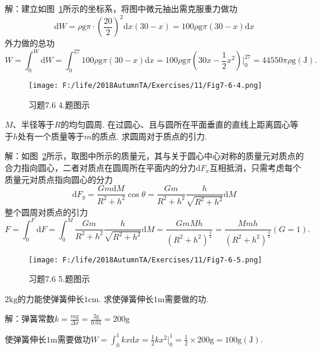 \documentclass[12pt,UTF8]{ctexart}
\begin{document}
\begin{enumerate}
解：建立如图~\ref{7-6-4}所示的坐标系，将图中微元抽出需克服重力做功
\[\mathrm dW=\rho\mathrm g\pi\cdot(\frac{20}2)^2\mathrm dx(30-x)=100\rho\mathrm g\pi(30-x)\mathrm dx\]
外力做的总功
\[W=\int_0^W\mathrm dW=\int_0^{27}100\rho\mathrm g\pi(30-x)\mathrm dx=100\rho\mathrm g\pi(30x-\frac12x^2)\Big|_0^{27}=44550\pi\rho\mathrm g(\mathrm J).\]
\begin{figure}[H]
\begin{center}
\texttt{[image: F:/life/2018AutumnTA/Exercises/11/Fig7-6-4.png]}
\end{center}
\caption{习题7.6 4.题图示}
\label{7-6-4}
\end{figure}
$M$、半径等于$R$的均匀圆周. 在过圆心、且与圆所在平面垂直的直线上距离圆心等于$h$处有一个质量等于$m$的质点. 求圆周对于质点的引力.

解：如图~\ref{7-6-5}所示，取图中所示的质量元，其与关于圆心中心对称的质量元对质点的合力指向圆心，二者对质点在圆周所在平面内的分力$\mathrm dF_x$互相抵消，只需考虑每个质量元对质点指向圆心的分力
\[\mathrm dF_y=\frac{Gm\mathrm dM}{R^2+h^2}\cos\theta=\frac{Gm}{R^2+h^2}\frac h{\sqrt{R^2+h^2}}\mathrm dM\]
整个圆周对质点的引力
\[F=\int_0^F\mathrm dF=\int_0^M\frac{Gm}{R^2+h^2}\frac h{\sqrt{R^2+h^2}}\mathrm dM=\frac{GmMh}{(R^2+h^2)^{\frac32}}=\frac{Mmh}{(R^2+h^2)^{\frac32}}(G=1).\]
\begin{figure}[H]
\begin{center}
\texttt{[image: F:/life/2018AutumnTA/Exercises/11/Fig7-6-5.png]}
\end{center}
\caption{习题7.6 5.题图示}
\label{7-6-5}
\end{figure}
$2\mathrm{kg}$的力能使弹簧伸长$1\mathrm{cm}$. 求使弹簧伸长$1\mathrm m$需要做的功.

解：弹簧常数$k=\frac{m\mathrm g}{\Delta x}=\frac{2\mathrm g}{0.01}=200\mathrm g$

使弹簧伸长$1\mathrm m$需要做功$W=\int_0^1kx\mathrm dx=\frac12kx^2\Big|_0^1=\frac12\times200\mathrm g=100\mathrm g(\mathrm J).$
\end{enumerate}
\end{document}
